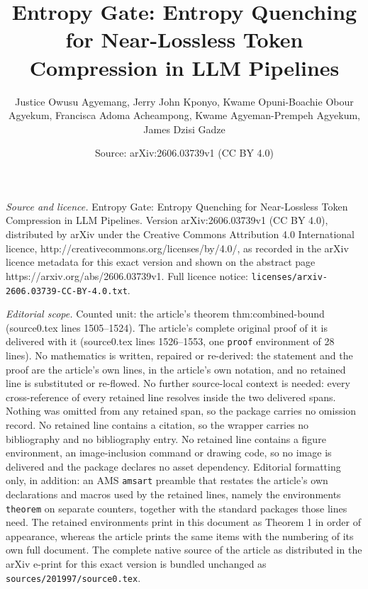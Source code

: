 \documentclass[10pt,a4paper]{amsart}
\title{Entropy Gate: Entropy Quenching for Near-Lossless Token Compression in LLM Pipelines}
\author{Justice Owusu Agyemang, Jerry John Kponyo, Kwame Opuni-Boachie Obour Agyekum, Francisca Adoma Acheampong, Kwame Agyeman-Prempeh Agyekum, James Dzisi Gadze}
\date{Source: arXiv:2606.03739v1 (CC BY 4.0)}
\begin{document}
\maketitle

\noindent\emph{Source and licence.} Entropy Gate: Entropy Quenching for Near-Lossless Token Compression in LLM Pipelines. Version arXiv:2606.03739v1 (CC BY 4.0), distributed by arXiv under the Creative Commons Attribution 4.0 International licence, http://creativecommons.org/licenses/by/4.0/, as recorded in the arXiv licence metadata for this exact version and shown on the abstract page https://arxiv.org/abs/2606.03739v1. Full licence notice: \texttt{licenses/arxiv-2606.03739-CC-BY-4.0.txt}.\par\smallskip

\noindent\textit{Editorial scope.} Counted unit: the article's theorem thm:combined-bound (source0.tex lines 1505--1524). The article's complete original proof of it is delivered with it (source0.tex lines 1526--1553, one \texttt{proof} environment of 28 lines). No mathematics is written, repaired or re-derived: the statement and the proof are the article's own lines, in the article's own notation, and no retained line is substituted or re-flowed.  No further source-local context is needed: every cross-reference of every retained line resolves inside the two delivered spans.  Nothing was omitted from any retained span, so the package carries no omission record.  No retained line contains a citation, so the wrapper carries no bibliography and no bibliography entry.  No retained line contains a figure environment, an image-inclusion command or drawing code, so no image is delivered and the package declares no asset dependency.  Editorial formatting only, in addition: an AMS \texttt{amsart} preamble that restates the article's own declarations and macros used by the retained lines, namely the environments \texttt{theorem} on separate counters, together with the standard packages those lines need.  The retained environments print in this document as Theorem 1 in order of appearance, whereas the article prints the same items with the numbering of its own full document.  The complete native source of the article as distributed in the arXiv e-print for this exact version is bundled unchanged as \texttt{sources/201997/source0.tex}.
\end{document}
